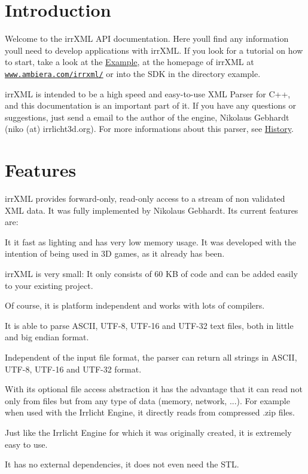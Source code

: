 \hypertarget{index_intro}{}\section{Introduction}\label{index_intro}
Welcome to the irr\+X\+ML A\+PI documentation. Here you\textquotesingle{}ll find any information you\textquotesingle{}ll need to develop applications with irr\+X\+ML. If you look for a tutorial on how to start, take a look at the \hyperlink{index_irrxmlexample}{Example}, at the homepage of irr\+X\+ML at \href{http://www.ambiera.com/irrxml/}{\tt www.\+ambiera.\+com/irrxml/} or into the S\+DK in the directory example.

irr\+X\+ML is intended to be a high speed and easy-\/to-\/use X\+ML Parser for C++, and this documentation is an important part of it. If you have any questions or suggestions, just send a email to the author of the engine, Nikolaus Gebhardt (niko (at) irrlicht3d.\+org). For more informations about this parser, see \hyperlink{index_history}{History}.\hypertarget{index_features}{}\section{Features}\label{index_features}
irr\+X\+ML provides forward-\/only, read-\/only access to a stream of non validated X\+ML data. It was fully implemented by Nikolaus Gebhardt. Its current features are\+:


\begin{DoxyItemize}
\item It it fast as lighting and has very low memory usage. It was developed with the intention of being used in 3D games, as it already has been.
\item irr\+X\+ML is very small\+: It only consists of 60 KB of code and can be added easily to your existing project.
\item Of course, it is platform independent and works with lots of compilers.
\item It is able to parse A\+S\+C\+II, U\+T\+F-\/8, U\+T\+F-\/16 and U\+T\+F-\/32 text files, both in little and big endian format.
\item Independent of the input file format, the parser can return all strings in A\+S\+C\+II, U\+T\+F-\/8, U\+T\+F-\/16 and U\+T\+F-\/32 format.
\item With its optional file access abstraction it has the advantage that it can read not only from files but from any type of data (memory, network, ...). For example when used with the Irrlicht Engine, it directly reads from compressed .zip files.
\item Just like the Irrlicht Engine for which it was originally created, it is extremely easy to use.
\item It has no external dependencies, it does not even need the S\+TL.
\end{DoxyItemize}

